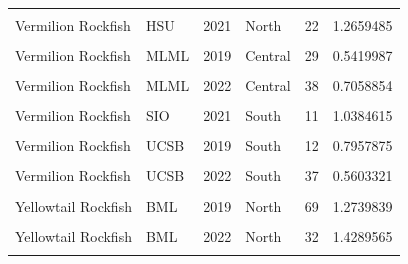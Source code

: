\documentclass[
]{article}
\begin{document}
\begin{longtable}[t]{llrlrr}
\cellcolor{gray!6}{Vermilion Rockfish} & \cellcolor{gray!6}{HSU} & \cellcolor{gray!6}{2019} & \cellcolor{gray!6}{North} & \cellcolor{gray!6}{15} & \cellcolor{gray!6}{1.3187554}\\
Vermilion Rockfish & HSU & 2021 & North & 22 & 1.2659485\\
\cellcolor{gray!6}{Vermilion Rockfish} & \cellcolor{gray!6}{HSU} & \cellcolor{gray!6}{2022} & \cellcolor{gray!6}{North} & \cellcolor{gray!6}{13} & \cellcolor{gray!6}{1.0557610}\\
Vermilion Rockfish & MLML & 2019 & Central & 29 & 0.5419987\\
\addlinespace
\cellcolor{gray!6}{Vermilion Rockfish} & \cellcolor{gray!6}{MLML} & \cellcolor{gray!6}{2021} & \cellcolor{gray!6}{Central} & \cellcolor{gray!6}{18} & \cellcolor{gray!6}{0.6092897}\\
Vermilion Rockfish & MLML & 2022 & Central & 38 & 0.7058854\\
\cellcolor{gray!6}{Vermilion Rockfish} & \cellcolor{gray!6}{SIO} & \cellcolor{gray!6}{2019} & \cellcolor{gray!6}{South} & \cellcolor{gray!6}{11} & \cellcolor{gray!6}{0.4227564}\\
Vermilion Rockfish & SIO & 2021 & South & 11 & 1.0384615\\
\cellcolor{gray!6}{Vermilion Rockfish} & \cellcolor{gray!6}{SIO} & \cellcolor{gray!6}{2022} & \cellcolor{gray!6}{South} & \cellcolor{gray!6}{36} & \cellcolor{gray!6}{0.5225564}\\
\addlinespace
Vermilion Rockfish & UCSB & 2019 & South & 12 & 0.7957875\\
\cellcolor{gray!6}{Vermilion Rockfish} & \cellcolor{gray!6}{UCSB} & \cellcolor{gray!6}{2021} & \cellcolor{gray!6}{South} & \cellcolor{gray!6}{25} & \cellcolor{gray!6}{0.6141829}\\
Vermilion Rockfish & UCSB & 2022 & South & 37 & 0.5603321\\
\cellcolor{gray!6}{Widow Rockfish} & \cellcolor{gray!6}{BML} & \cellcolor{gray!6}{2019} & \cellcolor{gray!6}{North} & \cellcolor{gray!6}{3} & \cellcolor{gray!6}{0.3504274}\\
Yellowtail Rockfish & BML & 2019 & North & 69 & 1.2739839\\
\addlinespace
\cellcolor{gray!6}{Yellowtail Rockfish} & \cellcolor{gray!6}{BML} & \cellcolor{gray!6}{2021} & \cellcolor{gray!6}{North} & \cellcolor{gray!6}{105} & \cellcolor{gray!6}{1.9997415}\\
Yellowtail Rockfish & BML & 2022 & North & 32 & 1.4289565\\
\cellcolor{gray!6}{Yellowtail Rockfish} & \cellcolor{gray!6}{Cal Poly} & \cellcolor{gray!6}{2019} & \cellcolor{gray!6}{Central} & \cellcolor{gray!6}{21} & \cellcolor{gray!6}{0.8394260}\\

\end{longtable}
\end{document}
